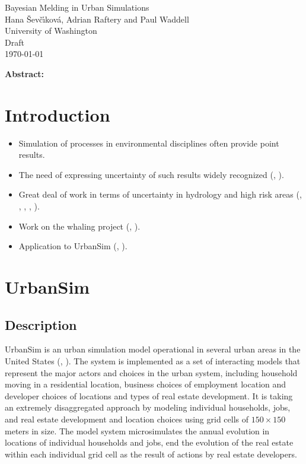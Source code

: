 \documentclass[11pt, fleqn]{article}
\begin{document}
\begin{center}
{\LARGE Bayesian Melding in Urban Simulations}\\[3mm]
Hana \v{S}ev\v{c}\'{\i}kov\'{a}, Adrian Raftery and Paul Waddell\\
University of Washington\\[5mm]
Draft\\
\today
\end{center}

{\bf Abstract:}

\vspace{1cm}

\section{Introduction}
\label{sec:Intro}
%
\begin{itemize}
\item Simulation of processes in environmental disciplines often provide
  point results. 
\item The need of expressing uncertainty of such results widely recognized
  (\citet{refsgaard04}, \citet{vanasselt02}).
\item Great deal of work in terms of uncertainty in hydrology and high risk
  areas (\citet{beven92}, \citet{beven00}, \citet{christensen03}, \citet{neuman03},
  \citet{korving03}).
\item Work on the whaling project (\citet{raftery95}, \citet{poole00}). 
\item Application to UrbanSim (\citet{waddell02}, \citet{waddell03}).
\end{itemize}

\section{UrbanSim}
\subsection{Description}
%
\label{sec:US-description}
UrbanSim is an urban simulation model operational in several urban areas in
the United States (\citet{waddell02}, \citet{waddell03}). The system is
implemented as a set of interacting models that represent the major actors and
choices in the urban system, including household moving in a residential
location, business choices of employment location and developer choices of
locations and types of real estate development. It is taking an extremely
disaggregated approach by modeling individual households, jobs, and real
estate development and location choices using grid cells of $150\times 150$
meters in size. The model system microsimulates the annual evolution in
locations of individual households and jobs, end the evolution of the real
estate within each individual grid cell as the result of actions by real
estate developers. 
\end{document}
